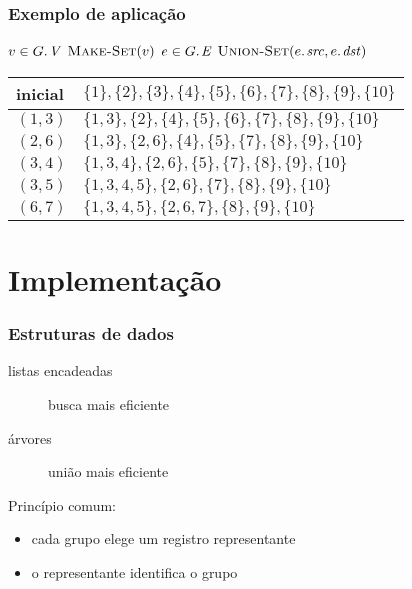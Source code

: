 \documentclass{beamer}
\begin{document}
\begin{frame}

\frametitle{Exemplo de aplicação}

\begin{codebox}
\li \For $v \in \attrib{G}{V}$
\li \Do $\textnormal{\scshape Make-Set}(v)$
    \End
\li \For $e \in \attrib{G}{E}$
\li \Do $\proc{Union-Set}(\attrib{e}{src}, \attrib{e}{dst})$
    \End
\end{codebox}
\pause
\begin{center}
\begin{tabular}{|l|l|}
\hline
inicial & $\{1\},\{2\},\{3\},\{4\},\{5\},\{6\},\{7\},\{8\},\{9\},\{10\}$ \\
\hline
$(1,3)$ & $\{1,3\},\{2\},\{4\},\{5\},\{6\},\{7\},\{8\},\{9\},\{10\}$ \\
\hline
$(2,6)$ & $\{1,3\},\{2,6\},\{4\},\{5\},\{7\},\{8\},\{9\},\{10\}$ \\
\hline
$(3,4)$ & $\{1,3,4\},\{2,6\},\{5\},\{7\},\{8\},\{9\},\{10\}$ \\
\hline
$(3,5)$ & $\{1,3,4,5\},\{2,6\},\{7\},\{8\},\{9\},\{10\}$ \\
\hline
$(6,7)$ & $\{1,3,4,5\},\{2,6,7\},\{8\},\{9\},\{10\}$ \\
\hline
\end{tabular}
\end{center}

\end{frame}

\section{Implementação}

\begin{frame}
\frametitle{Estruturas de dados}

\begin{description}
\item[listas encadeadas] busca mais eficiente
\item[árvores] união mais eficiente
\end{description}

Princípio comum: 
\begin{itemize}
\item cada grupo elege um registro \alert{representante}
\item o representante identifica o grupo
\end{itemize}


\end{frame}
\end{document}
